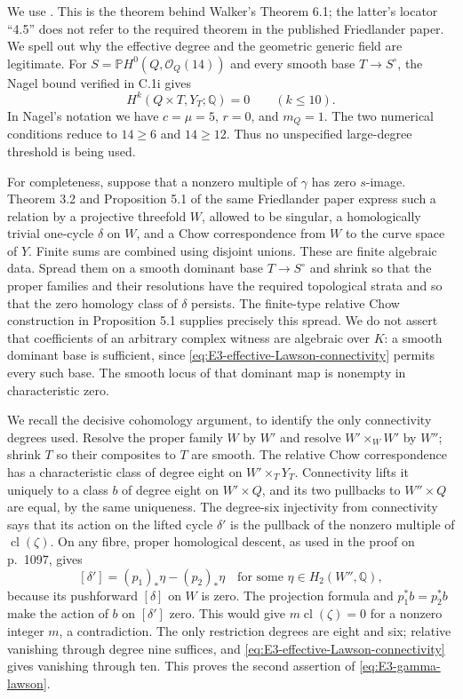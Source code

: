 We use \citet[Theorem 3.4, printed p.~1082, with its proof
on pp.~1095--1097]{cyFriedlander2000}. This is the theorem
behind Walker's Theorem 6.1; the latter's locator ``4.5''
does not refer to the required theorem in the published
Friedlander paper. We spell out why the effective degree
and the geometric generic field are legitimate. For
$S=\mathbb P H^0(Q,\mathcal O_Q(14))$ and every smooth
base $T\to S^\circ$, the Nagel bound verified in C.1i
gives
\begin{equation}\label{eq:E3-effective-Lawson-connectivity}
 H^k(Q\times T,Y_T;\mathbb Q)=0\qquad(k\le10).
\end{equation}
In Nagel's notation we have $c=\mu=5$, $r=0$, and
$m_Q=1$. The two numerical conditions reduce to
$14\ge6$ and $14\ge12$. Thus no unspecified large-degree
threshold is being used.

For completeness, suppose that a nonzero multiple of
$\gamma$ has zero $s$-image. Theorem 3.2 and
Proposition 5.1 of the same Friedlander paper express
such a relation by a projective threefold $W$, allowed
to be singular, a homologically trivial one-cycle
$\delta$ on $W$, and a Chow correspondence from $W$
to the curve space of $Y$. Finite sums are combined
using disjoint unions. These are finite algebraic data.
Spread them on a smooth dominant base $T\to S^\circ$
and shrink so that the proper families and their
resolutions have the required topological strata and
so that the zero homology class of $\delta$ persists.
The finite-type relative Chow construction in
Proposition 5.1 supplies precisely this spread.
We do not assert that coefficients of an arbitrary
complex witness are algebraic over $K$: a smooth
dominant base is sufficient, since
\eqref{eq:E3-effective-Lawson-connectivity} permits
every such base. The smooth locus of that dominant
map is nonempty in characteristic zero.

We recall the decisive cohomology argument, to identify
the only connectivity degrees used. Resolve the
proper family $W$ by $W'$ and resolve
$W'\times_W W'$ by $W''$; shrink $T$ so their
composites to $T$ are smooth. The relative Chow
correspondence has a characteristic class of degree
eight on $W'\times_TY_T$. Connectivity lifts it
uniquely to a class $b$ of degree eight on
$W'\times Q$, and its two pullbacks to
$W''\times Q$ are equal, by the same uniqueness.
The degree-six injectivity from connectivity says
that its action on the lifted cycle $\delta'$ is
the pullback of the nonzero multiple of
$\operatorname{cl}(\zeta)$. On any fibre, proper
homological descent, as used in the proof on p.~1097,
gives
\[
 [\delta']=(p_1)_*\eta-(p_2)_*\eta
                  \quad\text{for some }\eta\in H_2(W'',\mathbb Q),
\]
because its pushforward $[\delta]$ on $W$ is zero.
The projection formula and $p_1^*b=p_2^*b$ make
the action of $b$ on $[\delta']$ zero. This would
give $m\operatorname{cl}(\zeta)=0$ for a nonzero
integer $m$, a contradiction.
The only restriction degrees are eight and six;
relative vanishing through degree nine suffices,
and \eqref{eq:E3-effective-Lawson-connectivity}
gives vanishing through ten. This proves the second
assertion of \eqref{eq:E3-gamma-lawson}.

